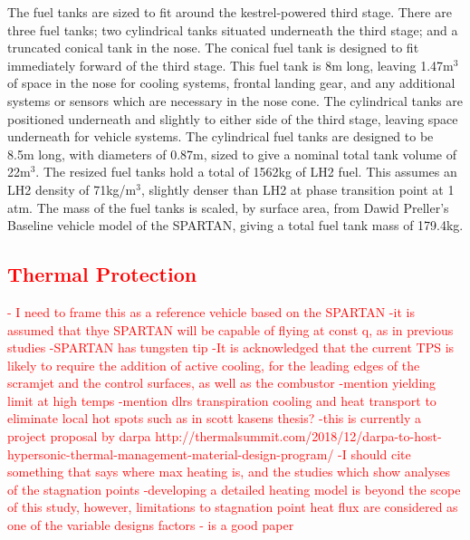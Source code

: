 		

		The fuel tanks are sized to fit around the kestrel-powered third stage. There are three fuel tanks; two cylindrical tanks situated underneath the third stage; and a truncated conical tank in the nose. The conical fuel tank is designed to fit immediately forward of the third stage. This fuel tank is 8m long, leaving 1.47m$^3$ of space in the nose for cooling systems, frontal landing gear, and any additional systems or sensors which are necessary in the nose cone. The cylindrical tanks are positioned underneath and slightly to either side of the third stage, leaving space underneath for vehicle systems. The cylindrical fuel tanks are designed to be 8.5m long, with diameters of 0.87m, sized to give a nominal total tank volume of 22m$^3$.
The resized fuel tanks hold a total of 1562kg of LH2 fuel. This assumes an LH2 density of 71kg/m$^3$, slightly denser than LH2 at phase transition point at 1 atm.
The mass of the fuel tanks is scaled, by surface area, from Dawid Preller's Baseline vehicle model of the SPARTAN\cite{Preller2017b}, giving a total fuel tank mass of 179.4kg.
		
		\textcolor{red}{\subsection{Thermal Protection}
			- I need to frame this as a reference vehicle based on the SPARTAN
			-it is assumed that thye SPARTAN will be capable of flying at const q, as in previous studies
			-SPARTAN has tungsten tip
			-It is acknowledged that the current TPS is likely to require the addition of active cooling, for the leading edges of the scramjet and the control surfaces, as well as the combustor
			-mention yielding limit at high temps
			-mention dlrs transpiration cooling and heat transport to eliminate local hot spots such as in scott kasens thesis?
			-this is currently a project proposal by darpa http://thermalsummit.com/2018/12/darpa-to-host-hypersonic-thermal-management-material-design-program/
			-I should cite something that says where max heating is, and the studies which show analyses of the stagnation points
			-developing a detailed heating model is beyond the scope of this study, however, limitations to stagnation point heat flux are considered as one of the variable designs factors
			-\cite{Marley2017} is a good paper
		}


